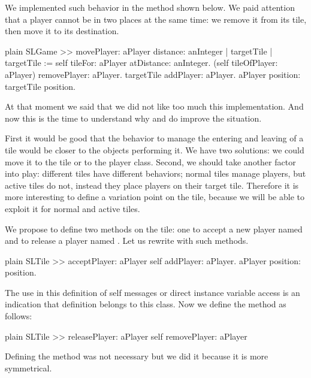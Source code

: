 \documentclass[10pt,twoside,english]{_support/latex/sbabook/sbabook}
\begin{document}
We implemented such behavior in the method  shown below. We paid attention that a player cannot be in two places at the same time: we remove it from its tile, then move it to its destination.

\begin{displaycode}{plain}
SLGame >> movePlayer: aPlayer distance: anInteger
	| targetTile |
	targetTile := self tileFor: aPlayer atDistance: anInteger.
	(self tileOfPlayer: aPlayer) removePlayer: aPlayer.
	targetTile addPlayer: aPlayer.
	aPlayer position: targetTile position.
\end{displaycode}

At that moment we said that we did not like too much this implementation. And now this is the time 
to understand why and do improve the situation. 

First it would be good that the behavior to manage the entering and leaving of a tile would be closer to the objects performing it. 
We have two solutions: we could move it to the tile or to the player class. 
Second, we should take another factor into play: different tiles have different behaviors; normal tiles manage players, but active tiles do not, instead they place players on their target tile. Therefore it is more interesting to define a variation point on the tile, because we will be able to exploit it for normal and active tiles.

We propose to define two methods on the tile: one to accept a new player named  and to release a player named . 
Let us rewrite  with such methods. 

\begin{displaycode}{plain}
SLTile >> acceptPlayer: aPlayer
	self addPlayer: aPlayer.
	aPlayer position: position.
\end{displaycode}

The use in this definition of self messages or direct instance variable access is an indication that definition belongs to this class. Now we define the method  as follows:

\begin{displaycode}{plain}
SLTile >> releasePlayer: aPlayer
	self removePlayer: aPlayer
\end{displaycode}

Defining the method  was not necessary but we did it because it is more
symmetrical. 
\end{document}
